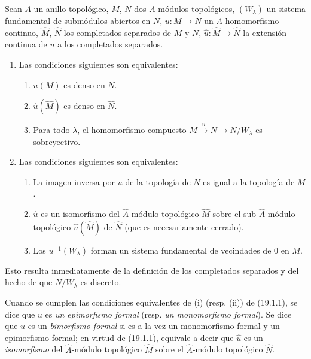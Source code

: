 \begin{proposition}[19.1.1]
\label{0.19.1.1-fr}
Sean $A$ un anillo topológico, $M$, $N$ dos $A$-módulos topológicos,
$(W_\lambda)$ un sistema fundamental de submódulos abiertos en $N$,
$u:M\to N$ un $A$-homomorfismo continuo, $\widehat M$, $\widehat N$ los
completados separados de $M$ y $N$, $\widehat u:\widehat M\to\widehat N$ la
extensión continua de $u$ a los completados separados.
\begin{enumerate}
  \item[\textup{(i)}] Las condiciones siguientes son equivalentes:
  \begin{enumerate}
    \item[\textup{a)}] $u(M)$ es denso en $N$.
    \item[\textup{a$'$)}] $\widehat u(\widehat M)$ es denso en $\widehat N$.
    \item[\textup{a$''$)}] Para todo $\lambda$, el homomorfismo compuesto
    $M\xrightarrow{u}N\to N/W_\lambda$ es sobreyectivo.
  \end{enumerate}
  \item[\textup{(ii)}] Las condiciones siguientes son equivalentes:
  \begin{enumerate}
    \item[\textup{b)}] La imagen inversa por $u$ de la topología de $N$ es igual a la
    topología de $M$.
    \item[\textup{b$'$)}] $\widehat u$ es un isomorfismo del $\widehat A$-módulo
    topológico $\widehat M$ sobre el sub-$\widehat A$-módulo topológico
    $\widehat u(\widehat M)$ de $\widehat N$ (que es necesariamente
    cerrado).
    \item[\textup{b$''$)}] Los $u^{-1}(W_\lambda)$ forman un sistema fundamental de
    vecindades de 0 en $M$.
  \end{enumerate}
\end{enumerate}
\end{proposition}

Esto resulta inmediatamente de la definición de los completados separados y del hecho
de que $N/W_\lambda$ es discreto.

\begin{env}[19.1.2]
\label{0.19.1.2-fr}
Cuando se cumplen las condiciones equivalentes de (i) (resp. (ii)) de (19.1.1),
se dice que $u$ es \emph{un epimorfismo formal} (resp. \emph{un
monomorfismo formal}). Se dice que $u$ es un \emph{bimorfismo formal}
si es a la vez un monomorfismo formal y un epimorfismo formal; en
virtud de (19.1.1), equivale a decir que $\widehat u$ es un
\emph{isomorfismo} del $\widehat A$-módulo topológico $\widehat M$ sobre el
$\widehat A$-módulo topológico $\widehat N$.
\end{env}

